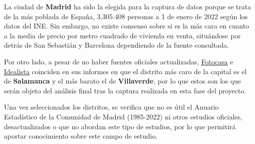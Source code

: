 \documentclass[12pt]{article}
\begin{document}
La ciudad de \textbf{Madrid} ha sido la elegida para la captura de datos porque se trata de la más poblada de España, 3.305.408 personas a 1 de enero de 2022 según los datos del INE. Sin embargo, no existe consenso sobre si es la más cara en cuanto a la media de precio por metro cuadrado de vivienda en venta, situándose por detrás de San Sebastián y Barcelona dependiendo de la fuente consultada. 

Por otro lado, a pesar de no haber fuentes oficiales actualizadas, \href{https://www.fotocasa.es/fotocasa-life/compraventa/conoce-el-precio-de-la-vivienda-en-venta-este-mes/}{\underline{Fotocasa}} e \href{https://www.idealista.com/sala-de-prensa/informes-precio-vivienda/venta/madrid-comunidad/madrid-provincia/madrid/}{\underline{Idealista}} coinciden en sus informes en que el distrito más caro de la capital es el de \textbf{Salamanca} y el más barato el de \textbf{Villaverde}, por lo que estos son los que serán objeto del análisis final tras la captura realizada en esta fase del proyecto.

Una vez seleccionados los distritos, se verifica que no es útil el Anuario Estadístico de la Comunidad de Madrid (1985-2022) ni otros estudios oficiales, desactualizados o que no abordan este tipo de estudios, por lo que permitirá aportar conocimiento sobre este campo de estudio. 
\end{document}
